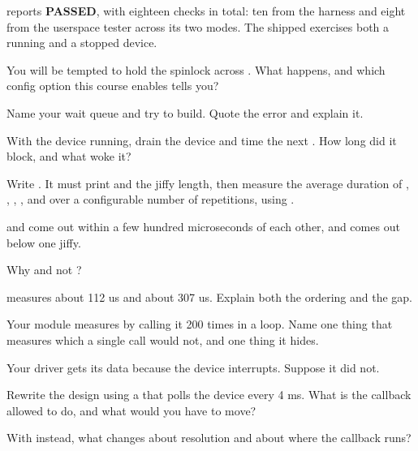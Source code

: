 \checkyourself {} reports \textbf{PASSED}, with eighteen checks in total: ten
from the harness and eight from the userspace tester across its two modes. The shipped
 exercises both a running and a stopped device.

 You will be tempted to hold the spinlock across . What
happens, and which config option this course enables tells you?

 Name your wait queue  and try to build. Quote the error and explain it.

 With the device running, drain the device and time the next . How long did it
block, and what woke it?

\label{c9:ex:7}

Write . It must print  and the jiffy length, then
measure the average duration of , , ,
,  and  over a
configurable number of repetitions, using .

\checkyourself {} and  come out within a few hundred microseconds of
each other, and  comes out below one jiffy.

 Why  and not ?

  measures about 112 us and  about 307 us.
Explain both the ordering and the gap.

 Your module measures  by calling it 200 times in a loop. Name one thing that
measures which a single call would not, and one thing it hides.

\label{c9:ex:8}

Your driver gets its data because the device interrupts. Suppose it did not.

 Rewrite the design using a  that polls the device every 4 ms. What is the
callback allowed to do, and what would you have to move?

 With  instead, what changes about resolution and about where the callback
runs?

